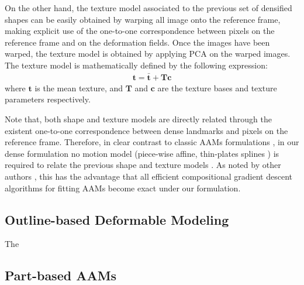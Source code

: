 On the other hand, the texture model associated to the previous set of densified shapes can be easily obtained by warping all image onto the reference frame, making explicit use of the one-to-one correspondence between pixels on the reference frame and on the deformation fields. Once the images have been warped, the texture model is obtained by applying PCA on the warped images. The texture model is mathematically defined by the following expression:
\begin{equation}
    \begin{aligned}
        \bm{t} = \bm{\bar{t}} + \bm{T} \bm{c}
    \end{aligned}
	\label{eq:tex_model}
\end{equation}
where $\bm{t}$ is the mean texture, and $\bm{T}$ and $\bm{c}$ are the texture bases and texture parameters respectively.

Note that, both shape and texture models are directly related through the existent one-to-one correspondence between dense landmarks and pixels on the reference
frame. Therefore, in clear contrast to classic AAMs formulations \cite{Cootes2001, Matthews2004}, in our dense formulation no motion model (piece-wise affine, thin-plates splines \cite{Bookstein1989}) is required to relate the previous shape and texture models . As noted by other authors \cite{Amberg2009, Tzimiropoulos2014}, this has the advantage that all efficient compositional gradient descent algorithms for fitting AAMs \cite{Papandreou2008, Matthews2004, Amberg2009, Tzimiropoulos2013, Alabort2014} become exact under our formulation.





\subsection{Outline-based Deformable Modeling}

The 




\subsection{Part-based AAMs}




